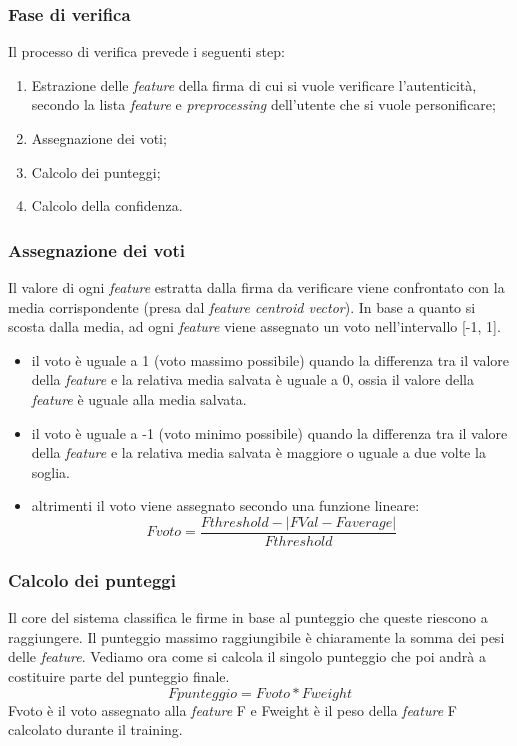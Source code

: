 \subsubsection*{Fase di verifica}
\label{2.1.4.2}
Il processo di verifica prevede i seguenti step:
\begin{enumerate}
\item Estrazione delle \emph{feature} della firma di cui si vuole verificare l'autenticità, secondo la lista \emph{feature} e \emph{preprocessing} dell'utente che si vuole personificare;
\item Assegnazione dei voti;
\item Calcolo dei punteggi;
\item Calcolo della confidenza.
\end{enumerate}
\subsubsection*{Assegnazione dei voti}
\label{2.1.4.3}
Il valore di ogni \emph{feature} estratta dalla firma da verificare viene confrontato con la media corrispondente (presa dal \emph{feature centroid vector}). In base a quanto si scosta dalla media, ad ogni \emph{feature} viene assegnato un voto nell'intervallo [-1, 1].
\begin{itemize}
\item il voto è uguale a 1 (voto massimo possibile) quando la differenza tra il valore della \emph{feature} e la relativa media salvata è uguale a 0, ossia il valore della \emph{feature} è uguale alla media salvata.
\item il voto è uguale a -1 (voto minimo possibile) quando la differenza tra il valore della \emph{feature} e la relativa media salvata è maggiore o uguale a due volte la soglia.
\item altrimenti il voto viene assegnato secondo una funzione lineare:
\[Fvoto=\frac{Fthreshold-|FVal-Faverage|}{Fthreshold}\]
\end{itemize}
\subsubsection*{Calcolo dei punteggi}
\label{2.1.4.4}
Il core del sistema classifica le firme in base al punteggio che queste riescono a raggiungere. Il punteggio massimo raggiungibile è chiaramente la somma dei pesi delle \emph{feature}. Vediamo ora come si calcola il singolo punteggio che poi andrà a costituire parte del punteggio finale.
\[Fpunteggio=Fvoto * Fweight\]
Fvoto è il voto assegnato alla \emph{feature} F e Fweight è il peso della \emph{feature} F calcolato durante il training.
